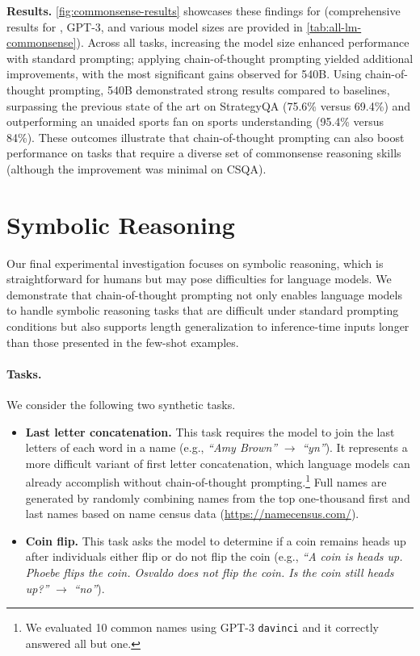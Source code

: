\textbf{Results.}  
\cref{fig:commonsense-results} showcases these findings for \palm{} (comprehensive results for \lamda{}, GPT-3, and various model sizes are provided in \cref{tab:all-lm-commonsense}).  
Across all tasks, increasing the model size enhanced performance with standard prompting; applying chain-of-thought prompting yielded additional improvements, with the most significant gains observed for \palm{} 540B. Using chain-of-thought prompting, \palm{} 540B demonstrated strong results compared to baselines, surpassing the previous state of the art on StrategyQA (75.6\% versus 69.4\%) and outperforming an unaided sports fan on sports understanding (95.4\% versus 84\%).  
These outcomes illustrate that chain-of-thought prompting can also boost performance on tasks that require a diverse set of commonsense reasoning skills (although the improvement was minimal on CSQA).



  
\section{Symbolic Reasoning}\label{sec:symbolic-reasoning}  
Our final experimental investigation focuses on symbolic reasoning, which is straightforward for humans but may pose difficulties for language models. We demonstrate that chain-of-thought prompting not only enables language models to handle symbolic reasoning tasks that are difficult under standard prompting conditions but also supports length generalization to inference-time inputs longer than those presented in the few-shot examples.

\paragraph{Tasks.}  
We consider the following two synthetic tasks.

\begin{itemize}[leftmargin=*,topsep=0pt]  
    \itemsep0em \item \textbf{Last letter concatenation.} This task requires the model to join the last letters of each word in a name (e.g., \textit{``Amy Brown''} $\rightarrow$ \textit{``yn''}).  
    It represents a more difficult variant of first letter concatenation, which language models can already accomplish without chain-of-thought prompting.\footnote{We evaluated 10 common names using GPT-3 \texttt{davinci} and it correctly answered all but one.} Full names are generated by randomly combining names from the top one-thousand first and last names based on name census data ({\small{\url{https://namecensus.com/}}}).  
    \item \textbf{Coin flip.} This task asks the model to determine if a coin remains heads up after individuals either flip or do not flip the coin (e.g., \textit{``A coin is heads up. Phoebe flips the coin. Osvaldo does not flip the coin. Is the coin still heads up?''} $\rightarrow$ \textit{``no''}).  
\end{itemize}

